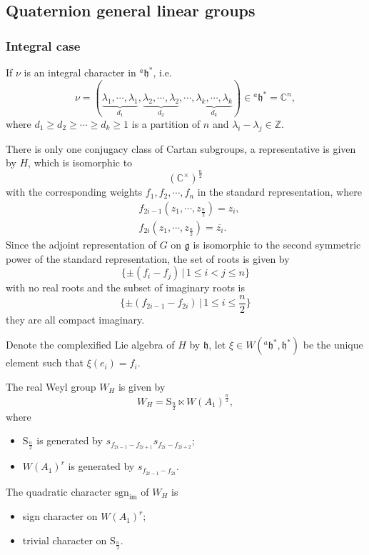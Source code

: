 \documentclass[12pt, a4paper]{amsart}
\numberwithin{equation}{section}
\newcommand{\BC}{{\mathbb {C}}}
\newcommand{\BZ}{{\mathbb {Z}}}
\newcommand{\fg}{\mathfrak{g}}
\newcommand{\fh}{\mathfrak{h}}
\newcommand{\sgn}{{\mathrm{sgn}}}
\newcommand{\set}[2]{\{#1\,|\,#2\}}
\renewcommand{\bar}{\overline}
\begin{document}
\subsection{Quaternion general linear groups}
\subsubsection{Integral case}
If $\nu$ is an integral character in $^{a}\fh^*$, i.e. 
$$\nu =  (\underbrace{\lambda_1, \cdots, \lambda_1}_{d_1}, \underbrace{\lambda_2, \cdots, \lambda_2}_{d_2}, \cdots, \underbrace{\lambda_k, \cdots, \lambda_k}_{d_k} ) \in {^{a}\fh^*} = \BC^n,$$ 
where $d_1 \geq d_2 \geq \cdots \geq d_k \geq 1$ is a partition of $n$ and $\lambda_i - \lambda_j \in \BZ$. 

There is only one conjugacy class of Cartan subgroups, a representative is given by $H$, which is isomorphic to
$$(\BC^\times)^{\frac{n}{2}}$$
with the corresponding weights $f_1, f_2, \cdots ,f_n$ in the standard representation, where
\begin{align}
    &f_{2i-1}(z_1,\cdots,z_{\frac{n}{2}}) = z_i,\\
    &f_{2i}(z_1,\cdots,z_{\frac{n}{2}}) = \bar{z_i}.
\end{align}
Since the adjoint representation of $G$ on $\fg$ is isomorphic to the second symmetric power of the standard representation, the set of roots is given by
$$\set{\pm(f_i - f_j)}{1\leq i < j \leq n}$$
with no real roots and the subset of imaginary roots is
$$\set{\pm(f_{2i-1}-f_{2i})}{1 \leq i \leq \frac{n}{2}}$$
they are all compact imaginary. 

Denote the complexified Lie algebra of $H$ by $\fh$, let $\xi \in W({^{a}\fh^*},\fh^*)$ be the unique element such that $\xi(e_i) = f_i$.

The real Weyl group $W_{H}$ is given by
$$W_{H} = \mathrm{S}_{\frac{n}{2}} \ltimes W(A_1)^{\frac{n}{2}},$$
where 
\begin{itemize}
    \item $\mathrm{S}_{\frac{n}{2}}$ is generated by $s_{f_{2i-1}-f_{2i+1}}s_{f_{2i}-f_{2i+2}}$;
    \item $W(A_1)^r$ is generated by $s_{f_{2i-1}-f_{2i}}$.
\end{itemize}



The quadratic character $\sgn_{\mathrm{im}}$ of $W_{H}$ is 
\begin{itemize}
    \item sign character on $W(A_1)^r$;
    \item trivial character on $\mathrm{S}_{\frac{n}{2}}$.
\end{itemize}
\end{document}
